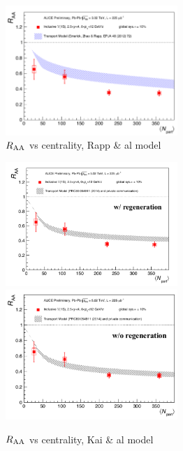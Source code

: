 

\begin{figure}[!h]
  \centering \includegraphics[width=6.5cm]{Results/Antoine_results_2016_06_07/RAA_vs_cent_5TeV_model_Emerick.pdf}
  \caption{\label{rapp}\scriptsize $R_{\rm AA}$ vs centrality, Rapp \& al model}
\end{figure} 
      

\begin{figure}[!h]
  \centering \includegraphics[width=6.5cm]{Results/Antoine_results_2016_06_07/RAA_vs_cent_5TeV_model_Zhou_wt_regeration.pdf}
  \centering \includegraphics[width=6.5cm]{Results/Antoine_results_2016_06_07/RAA_vs_cent_5TeV_model_Zhou_wo_regeration.pdf}
  \caption{\label{kai}\scriptsize $R_{\rm AA}$ vs centrality, Kai \& al model}
\end{figure}       


